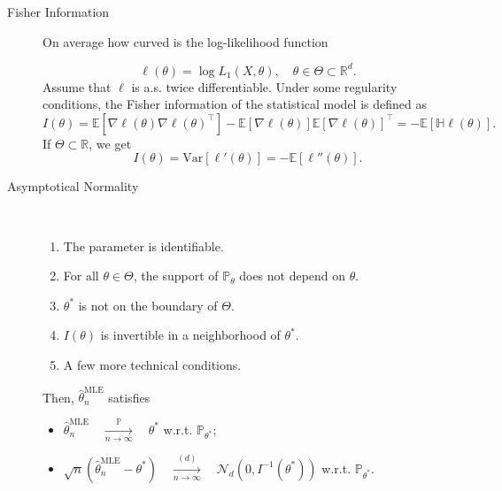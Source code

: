 \documentclass[a4paper, 10pt,landscape]{article}
\newcommand{\var}{\textrm{Var}}
\begin{document}
\begin{multicols*}{3}
\begin{description}
	\item[Fisher Information] On average how curved is the log-likelihood function
		
		$$\ell(\theta)=\log L_1\left(X,\theta\right),\quad\theta\in\Theta\subset\mathbb{R}^d.$$
		Assume that $\ell$ is a.s. twice differentiable. Under some regularity conditions, the Fisher information of the statistical model is defined as
		$$I(\theta)=\mathbb{E}\left[\nabla\ell(\theta)\nabla\ell(\theta)^\intercal\right]-\mathbb{E}\left[\nabla\ell(\theta)\right]\mathbb{E}\left[\nabla\ell(\theta)\right]^\intercal=-\mathbb{E}\left[\mathbb{H}\ell(\theta)\right].$$
		If $\Theta\subset\mathbb{R}$, we get
		$$I(\theta)=\var\left[\ell'(\theta)\right]=-\mathbb{E}\left[\ell''(\theta)\right].$$
	
	\item[Asymptotical Normality]~
		\begin{enumerate}
		\item The parameter is identifiable.
		\item For all $\theta\in\Theta$, the support of $\mathbb{P}_\theta$ does not depend on $\theta$.
		\item $\theta^*$ is not on the boundary of $\Theta$.
		\item $I(\theta)$ is invertible in a neighborhood of $\theta^*$.
		\item A few more technical conditions.
		\end{enumerate}
		Then, $\hat{\theta}_n^\text{MLE}$ satisfies
		\begin{itemize}
			\item $\hat{\theta}_n^\text{MLE}\quad\xrightarrow[n\rightarrow\infty]{\mathbb{P}}\quad\theta^*$ w.r.t. $\mathbb{P}_{\theta^*}$;
			\item $\sqrt{n}\left(\hat{\theta}_n^\text{MLE}-\theta^*\right)\quad\xrightarrow[n\rightarrow\infty]{(d)}\quad\mathcal{N}_d\left(0,I^{-1}(\theta^*)\right)$ w.r.t. $\mathbb{P}_{\theta^*}$.
		\end{itemize}		
	

\end{description}
\end{multicols*}
\end{document}
